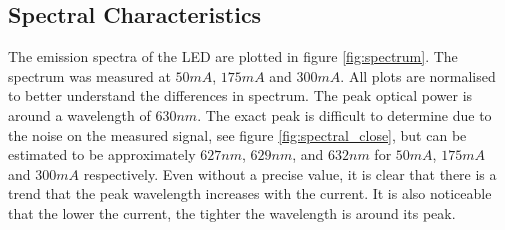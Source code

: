 \subsection{Spectral Characteristics}
\label{sec:test:spectral}

%



The emission spectra of the LED are plotted in figure \ref{fig:spectrum}. The spectrum was measured at $50mA$, $175mA$ and $300mA$. All plots are normalised to better understand the differences in spectrum. The peak optical power is around a wavelength of $630nm$. The exact peak is difficult to determine due to the noise on the measured signal, see figure \ref{fig:spectral_close}, but can be estimated to be approximately $627nm$, $629nm$, and $632nm$ for $50mA$, $175mA$ and $300mA$ respectively. Even without a precise value, it is clear that there is a trend that the peak wavelength increases with the current. It is also noticeable that the lower the current, the tighter the wavelength is around its peak. 
